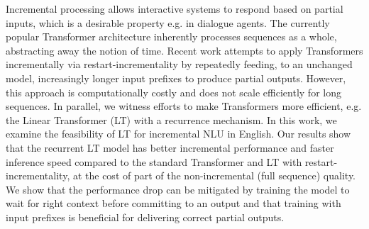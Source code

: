 Incremental processing allows interactive systems to respond based on partial inputs, which is a desirable property e.g. in dialogue agents. The currently popular Transformer architecture inherently processes sequences as a whole, abstracting away the notion of time. Recent work attempts to apply Transformers incrementally via restart-incrementality by repeatedly feeding, to an unchanged model, increasingly longer input prefixes to produce partial outputs. However, this approach is computationally costly and does not scale efficiently for long sequences. In parallel, we witness efforts to make Transformers more efficient, e.g. the Linear Transformer (LT) with a recurrence mechanism. In this work, we examine the feasibility of LT for incremental NLU in English. Our results show that the recurrent LT model has better incremental performance and faster inference speed compared to the standard Transformer and LT with restart-incrementality, at the cost of part of the non-incremental (full sequence) quality. We show that the performance drop can be mitigated by training the model to wait for right context before committing to an output and that training with input prefixes is beneficial for delivering correct partial outputs.
